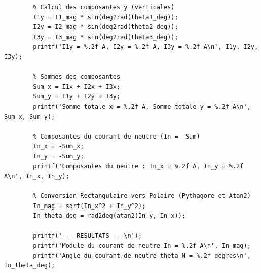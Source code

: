 \documentclass[a4paper,11pt,answers,addpoints]{exam}
\begin{document}
\begin{questions}
\begin{solution}
\begin{verbatim}
		% Calcul des composantes y (verticales)
		I1y = I1_mag * sin(deg2rad(theta1_deg));
		I2y = I2_mag * sin(deg2rad(theta2_deg));
		I3y = I3_mag * sin(deg2rad(theta3_deg));
		printf('I1y = %.2f A, I2y = %.2f A, I3y = %.2f A\n', I1y, I2y, I3y);
		
		% Sommes des composantes
		Sum_x = I1x + I2x + I3x;
		Sum_y = I1y + I2y + I3y;
		printf('Somme totale x = %.2f A, Somme totale y = %.2f A\n', Sum_x, Sum_y);
		
		% Composantes du courant de neutre (In = -Sum)
		In_x = -Sum_x;
		In_y = -Sum_y;
		printf('Composantes du neutre : In_x = %.2f A, In_y = %.2f A\n', In_x, In_y);
		
		% Conversion Rectangulaire vers Polaire (Pythagore et Atan2)
		In_mag = sqrt(In_x^2 + In_y^2);
		In_theta_deg = rad2deg(atan2(In_y, In_x));
		
		printf('--- RESULTATS ---\n');
		printf('Module du courant de neutre In = %.2f A\n', In_mag);
		printf('Angle du courant de neutre theta_N = %.2f degres\n', In_theta_deg);
	\end{verbatim}
\end{solution}


\end{questions}
\end{document}
